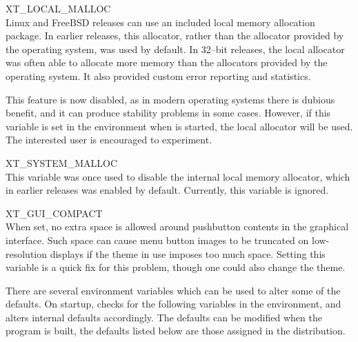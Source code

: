 \begin{description}
\item{\et XT\_LOCAL\_MALLOC}\\
Linux and FreeBSD releases can use an included local memory allocation
package.  In earlier {\WRspice} releases, this allocator, rather than
the allocator provided by the operating system, was used by default. 
In 32--bit releases, the local allocator was often able to allocate
more memory than the allocators provided by the operating system.  It
also provided custom error reporting and statistics.

This feature is now disabled, as in modern operating systems there is
dubious benefit, and it can produce stability problems in some cases. 
However, if this variable is set in the environment when {\WRspice} is
started, the local allocator will be used.  The interested user is
encouraged to experiment.

\item{\et XT\_SYSTEM\_MALLOC}\\
This variable was once used to disable the internal local memory
allocator, which in earlier releases was enabled by default. 
Currently, this variable is ignored.

\item{\et XT\_GUI\_COMPACT}\\
When set, no extra space is allowed around pushbutton contents in the
graphical interface.  Such space can cause menu button images to
be truncated on low-resolution displays if the theme in use imposes
too much space.  Setting this variable is a quick fix for this
problem, though one could also change the theme.
\end{description}

There are several environment variables which can be used to alter
some of the {\WRspice} defaults.  On startup, {\WRspice} checks for the
following variables in the environment, and alters internal defaults
accordingly.  The defaults can be modified when the program is built,
the defaults listed below are those assigned in the distribution.

